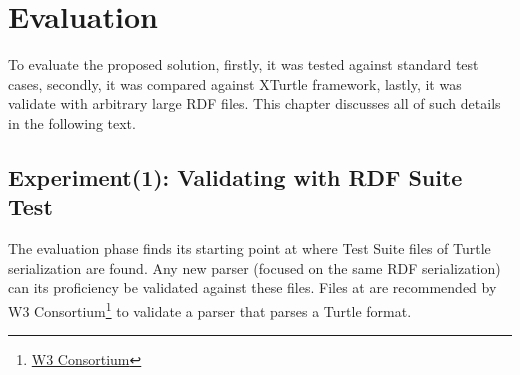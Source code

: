 \chapter{Evaluation}
\label{ch:evaluation}
To evaluate the proposed solution, firstly, it was tested against standard test cases, secondly, it was compared against XTurtle framework, lastly, it was validate with arbitrary large RDF files. This chapter discusses all of such details in the following text. 
\section{Experiment(1): Validating with RDF Suite Test}
The evaluation phase finds its starting point at \citealp{TurtleTests:Online} where Test Suite files of Turtle serialization are found. Any new parser (focused on the same RDF serialization) can its proficiency be validated against these files. Files at \cite{TurtleTests:Online} are recommended by W3 Consortium\footnote{\href{https://www.w3.org/}{W3 Consortium}} to validate a parser that parses a Turtle format.  




